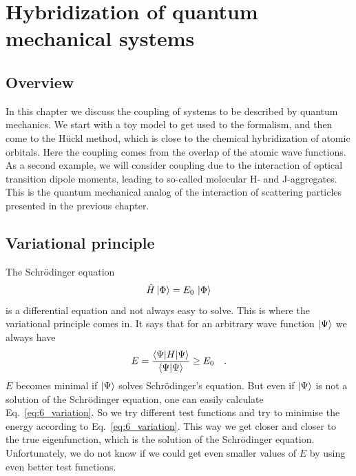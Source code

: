 \renewcommand{\lastmod}{January 10, 2026}
\renewcommand{\chapterauthors}{Markus Lippitz}

\chapter{Hybridization of quantum mechanical systems}
\label{chap:hybrid_quantum}

\section*{Overview}

In this chapter we discuss the coupling of systems to be described by quantum mechanics. We start with a toy model to get used to the formalism, and then come to the Hückl method, which is close to the chemical hybridization of atomic orbitals. Here the coupling comes from the overlap of the atomic wave functions. As a second example, we will consider coupling due to the interaction of optical transition dipole moments, leading to so-called molecular H- and J-aggregates. This is the quantum mechanical analog of the interaction of scattering particles presented in the previous chapter.





\section{Variational principle}

The Schrödinger equation
\begin{equation}
 \hat{H} \ket{\Phi} = E_0 \, \ket{\Phi} 
\end{equation}
is a differential equation and not always easy to solve.  This is where the variational principle comes in.
It says that for an arbitrary wave function $\ket{\Psi}$ we always have
\begin{equation}
 E = \frac{\braket{\Psi | H | \Psi}} {\braket{\Psi | \Psi}} \ge E_0 \quad .
 \label{eq:6_variation}
\end{equation}
$E$ becomes minimal if $\ket{\Psi}$ solves Schrödinger's equation. But even if $\ket{\Psi}$ is not a solution of the Schrödinger equation, one can easily calculate Eq.~\ref{eq:6_variation}. So we try different test functions and try to minimise the energy according to Eq.~\ref{eq:6_variation}. This way we get closer and closer to the true eigenfunction, which is the solution of the Schrödinger equation. Unfortunately, we do not know if we could get even smaller values of $E$ by using even better test functions.


